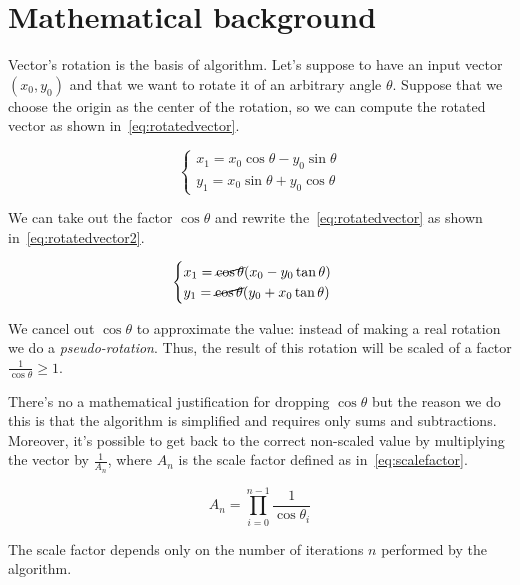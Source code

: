 \section{Mathematical background}\label{sec:math}

Vector's rotation is the basis of \cordic{} algorithm. Let's suppose to have an
input vector \((x_0, y_0)\) and that we want to rotate it of an arbitrary angle
\(\theta\). Suppose that we choose the origin as the center of the rotation, so
we can compute the rotated vector as shown in~\eqref{eq:rotatedvector}.

\begin{equation}\label{eq:rotatedvector}
	\begin{cases}
		x_1 = x_0\cos\theta - y_0\sin\theta\\
		y_1 = x_0\sin\theta + y_0\cos\theta
	\end{cases}
\end{equation}

We can take out the factor \(\cos\theta\) and rewrite
the~\eqref{eq:rotatedvector} as shown in~\eqref{eq:rotatedvector2}.

\begin{equation}\label{eq:rotatedvector2}
	\begin{cases}
		x_1 = \cancel{\cos\theta}(x_0 - y_0\tan\theta)\\
		y_1 = \cancel{\cos\theta}(y_0 + x_0\tan\theta)
	\end{cases}
\end{equation}

We cancel out \(\cos\theta\) to approximate the value: instead of making a real
rotation we do a \emph{pseudo-rotation}. Thus, the result of this rotation will
be scaled of a factor \(\frac{1}{\cos\theta} \ge 1\).

There's no a mathematical justification for dropping \(\cos\theta\) but the
reason we do this is that the algorithm is simplified and requires only sums and
subtractions. Moreover, it's possible to get back to the correct non-scaled
value by multiplying the vector by \(\frac{1}{A_n}\), where \(A_n\) is the scale
factor defined as in~\eqref{eq:scalefactor}.

\begin{equation}\label{eq:scalefactor}
	A_n = \prod_{i=0}^{n-1} \frac{1}{\cos\theta_i}
\end{equation}

The scale factor depends only on the number of iterations \(n\) performed by the
algorithm.

